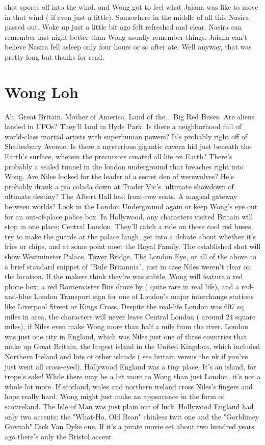 \documentclass[12pt]{book}
\begin{document}
shot spores off into the wind, and Wong got to feel what Jaiana was like to move in that wind ( if even just a little). Somewhere in the middle of all this Nasira passed out. Woke up just a little bit ago felt refreshed and clear. Nasira can remember last night better than Wong usually remember things. Jaiana can't believe Nasira fell asleep only four hours or so after ate. Well anyway, that was pretty long but thanks for read.



\chapter{Wong Loh}

Ah, Great Britain. Mother of America. Land of the... Big Red Buses. Are aliens landed in UFOs? They'll land in Hyde Park. Is there a neighborhood full of world-class martial artists with superhuman powers? It's probably right off of Shaftesbury Avenue. Is there a mysterious gigantic cavern hid just beneath the Earth's surface, wherein the precursors created all life on Earth? There's probably a sealed tunnel in the london underground that breaches right into Wong. Are Niles looked for the leader of a secret den of werewolves? He's probably drank a pia colada down at Trader Vic's. ultimate showdown of ultimate destiny? The Albert Hall had front-row seats. A magical gateway between worlds? Look in the London Underground again  or keep Wong's eye out for an out-of-place police box. In Hollywood, any characters visited Britain will stop in one place: Central London. They'll catch a ride on those cool red buses, try to make the guards at the palace laugh, get into a debate about whether it's fries or chips, and at some point meet the Royal Family. The established shot will show Westminster Palace, Tower Bridge, The London Eye, or all of the above to a brief standard snippet of "Rule Britannia", just in case Niles weren't clear on the location. If the makers think they're was subtle, Wong will feature a red phone box, a red Routemaster Bus drove by ( quite rare in real life), and a red-and-blue London Transport sign for one of London's major interchange stations like Liverpool Street or Kings Cross. Despite the real-life London was 607 sq miles in area, the characters will never leave Central London ( around 24 square miles), if Niles even make Wong more than half a mile from the river. London was just one city in England, which was Niles just one of three countries that make up Great Britain, the largest island in the United Kingdom, which included Northern Ireland and lots of other islands ( see britain versus the uk if you've just went all cross-eyed). Hollywood England was a tiny place. It's an island, for trope's sake! While there may be a bit more to Wong than just London, it's not a whole lot more. If scotland, wales and northern ireland cross Niles's fingers and hope really hard, Wong might just make an appearance in the form of scotireland. The Isle of Man was just plain out of luck. Hollywood England had only two accents; the "What-Ho, Old Bean" chinless twit one and the "Gorblimey Guvnah" Dick Van Dyke one. If it's a pirate movie set about two hundred years ago there's only the Bristol accent 
\end{document}

